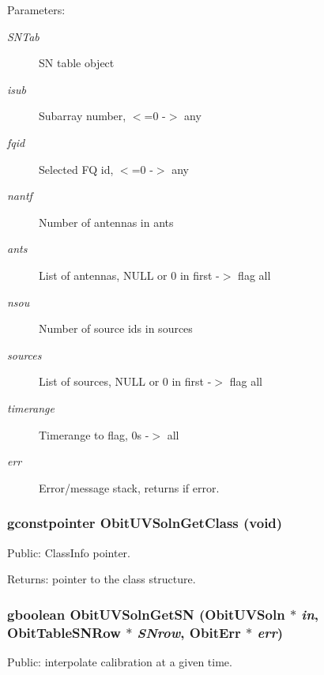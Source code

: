 \begin{Desc}
\item[Parameters:]
\begin{description}
\item[{\em SNTab}]SN table object \item[{\em isub}]Subarray number, $<$=0 -$>$ any \item[{\em fqid}]Selected FQ id, $<$=0 -$>$ any \item[{\em nantf}]Number of antennas in ants \item[{\em ants}]List of antennas, NULL or 0 in first -$>$ flag all \item[{\em nsou}]Number of source ids in sources \item[{\em sources}]List of sources, NULL or 0 in first -$>$ flag all \item[{\em timerange}]Timerange to flag, 0s -$>$ all \item[{\em err}]Error/message stack, returns if error. \end{description}
\end{Desc}
\subsubsection{\setlength{\rightskip}{0pt plus 5cm}gconstpointer Obit\-UVSoln\-Get\-Class (void)}\label{ObitUVSoln_8c_a21}


Public: Class\-Info pointer. 

\begin{Desc}
\item[Returns:]pointer to the class structure. \end{Desc}
\subsubsection{\setlength{\rightskip}{0pt plus 5cm}gboolean Obit\-UVSoln\-Get\-SN ({\bf Obit\-UVSoln} $\ast$ {\em in}, {\bf Obit\-Table\-SNRow} $\ast$ {\em SNrow}, {\bf Obit\-Err} $\ast$ {\em err})}\label{ObitUVSoln_8c_a24}


Public: interpolate calibration at a given time. 

